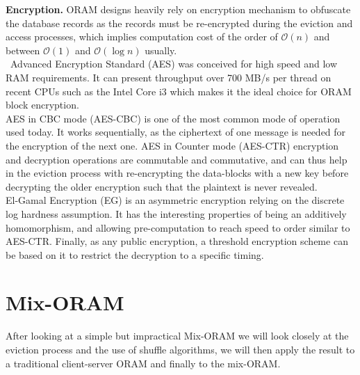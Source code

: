 \documentclass{llncs}
\begin{document}
\noindent\textbf{Encryption.}
ORAM designs heavily rely on encryption mechanism to obfuscate the database records as the records must be re-encrypted during the eviction and access processes, which implies computation cost of the order of $\mathcal{O} \left ( n \right )$ and between $\mathcal{O} \left ( 1 \right )$ and $\mathcal{O} \left ( \log n \right )$ usually.\\\
Advanced Encryption Standard (AES) was conceived for high speed and low RAM requirements. It can present throughput over 700 MB/s per thread on recent CPUs such as the Intel Core i3 which makes it the ideal choice for ORAM block encryption.\\
AES in CBC mode (AES-CBC) is one of the most common mode of operation used today. It works sequentially, as the ciphertext of one message is needed for the encryption of the next one. 
AES in Counter mode (AES-CTR) encryption and decryption operations are commutable and commutative, and can thus help in the eviction process with re-encrypting the data-blocks with a new key before decrypting the older encryption such that the plaintext is never revealed.\\
El-Gamal Encryption (EG) is an asymmetric encryption relying on the discrete log hardness assumption. It has the interesting properties of being an additively homomorphism, and allowing pre-computation to reach speed to order similar to AES-CTR. Finally, as any public encryption, a threshold encryption scheme can be based on it to restrict the decryption to a specific timing.
%
\section{Mix-ORAM}\label{Mix-ORAM}
After looking at a simple but impractical Mix-ORAM we will look closely at the eviction process and the use of shuffle algorithms, we will then apply the result to a traditional client-server ORAM and finally to the mix-ORAM.
%
\end{document}
